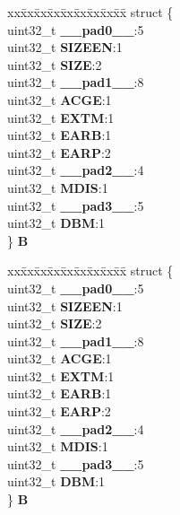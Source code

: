 \begin{DoxyCompactItemize}
\begin{tabbing}
\end{tabbing}\item 
\mbox{\label{unionEBI__tag_1_1EBI__MCR__tag_a433e7330d5b4635e85aaa8d8155ab0b1}} 
\begin{tabbing}
xx\=xx\=xx\=xx\=xx\=xx\=xx\=xx\=xx\=\kill
struct \{\\
\>uint32\_t {\bfseries \_\_pad0\_\_}:5\\
\>uint32\_t {\bfseries SIZEEN}:1\\
\>uint32\_t {\bfseries SIZE}:2\\
\>uint32\_t {\bfseries \_\_pad1\_\_}:8\\
\>uint32\_t {\bfseries ACGE}:1\\
\>uint32\_t {\bfseries EXTM}:1\\
\>uint32\_t {\bfseries EARB}:1\\
\>uint32\_t {\bfseries EARP}:2\\
\>uint32\_t {\bfseries \_\_pad2\_\_}:4\\
\>uint32\_t {\bfseries MDIS}:1\\
\>uint32\_t {\bfseries \_\_pad3\_\_}:5\\
\>uint32\_t {\bfseries DBM}:1\\
\} {\bfseries B}\\

\end{tabbing}\item 
\mbox{\label{unionEBI__tag_1_1EBI__MCR__tag_a3c641ab129a0d5cd85f953c92d522d0e}} 
\begin{tabbing}
xx\=xx\=xx\=xx\=xx\=xx\=xx\=xx\=xx\=\kill
struct \{\\
\>uint32\_t {\bfseries \_\_pad0\_\_}:5\\
\>uint32\_t {\bfseries SIZEEN}:1\\
\>uint32\_t {\bfseries SIZE}:2\\
\>uint32\_t {\bfseries \_\_pad1\_\_}:8\\
\>uint32\_t {\bfseries ACGE}:1\\
\>uint32\_t {\bfseries EXTM}:1\\
\>uint32\_t {\bfseries EARB}:1\\
\>uint32\_t {\bfseries EARP}:2\\
\>uint32\_t {\bfseries \_\_pad2\_\_}:4\\
\>uint32\_t {\bfseries MDIS}:1\\
\>uint32\_t {\bfseries \_\_pad3\_\_}:5\\
\>uint32\_t {\bfseries DBM}:1\\
\} {\bfseries B}\\


\end{tabbing}
\end{DoxyCompactItemize}
